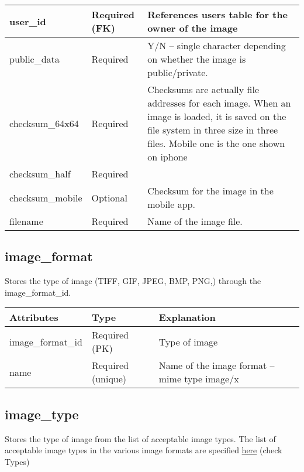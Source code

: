 \documentclass[letterpaper,10pt,english]{sphinxmanual}
\begin{document}
\begin{tabulary}{\linewidth}{|L|L|L|}
user\_id
 & 
Required (FK)
 & 
References users table for the owner of the image
\\\hline

public\_data
 & 
Required
 & 
Y/N – single character depending on whether the image is public/private.
\\\hline

checksum\_64x64
 & 
Required
 & 
Checksums are actually file addresses for each image. When an image
is loaded, it is saved on the file system in three size in three files.
Mobile one is the one shown on iphone
\\\hline

checksum\_half
 & 
Required
 & \\\hline

checksum\_mobile
 & 
Optional
 & 
Checksum for the image in the mobile app.
\\\hline

filename
 & 
Required
 & 
Name of the image file.
\\\hline
\end{tabulary}



\subsection{image\_format}
\label{Table_Description:image-format}
Stores the type of image (TIFF, GIF, JPEG, BMP, PNG,) through the image\_format\_id.

\begin{tabulary}{\linewidth}{|L|L|L|}
\hline
\textbf{
Attributes
} & \textbf{
Type
} & \textbf{
Explanation
}\\\hline

image\_format\_id
 & 
Required (PK)
 & 
Type of image
\\\hline

name
 & 
Required (unique)
 & 
Name of the image format – mime type image/x
\\\hline
\end{tabulary}



\subsection{image\_type}
\label{Table_Description:image-type}
Stores the type of image from the list of acceptable image types. The list of acceptable image types in the various image formats are specified \href{http://wiki.cs.rpi.edu/trac/metpetdb/wiki/Image}{here} (check Types)
\end{document}
